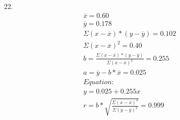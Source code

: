 \documentclass{article}
\begin{document}
22.\begin{equation}
    \begin{multlined}
        \overline{x} = 0.60\\
        \overline{y} = 0.178\\
        \Sigma\left(x - \overline{x}\right)*\left(y - \overline{y}\right) = 0.102\\
        \Sigma\left(x - \overline{x}\right)^2 = 0.40\\
        b = \frac{\Sigma\left(x - \overline{x}\right)*\left(y - \overline{y}\right)}{\Sigma\left(x - \overline{x}\right)^2} = 0.255\\
        a = \overline{y} - b*\overline{x} = 0.025\\
        Equation:\\
        y = 0.025+0.255x\\
        r = b*\sqrt{\frac{\Sigma\left(x - \overline{x}\right)^2}{\Sigma\left(y - \overline{y}\right)^2}} = 0.999\\
    \end{multlined}
\end{equation}
\end{document}
